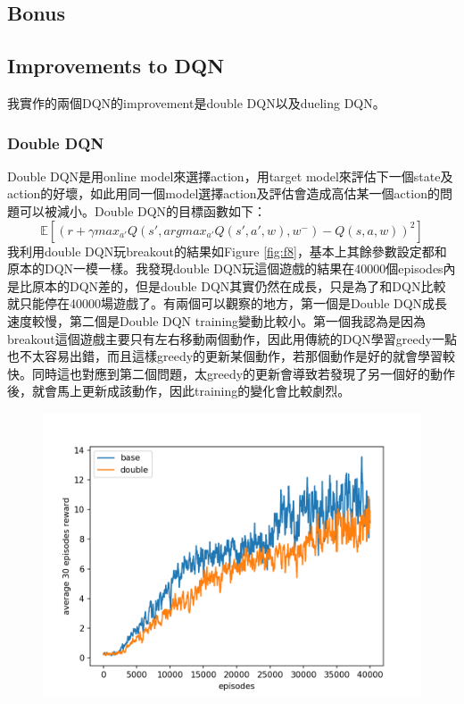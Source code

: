 \documentclass[12pt, a4paper]{article}
\begin{document}
\begin{CJK}{UTF8}{bkai}
\section{Bonus}

\subsection{Improvements to DQN}
我實作的兩個DQN的improvement是double DQN以及dueling DQN。
\subsubsection{Double DQN}
Double DQN是用online model來選擇action，用target model來評估下一個state及action的好壞，如此用同一個model選擇action及評估會造成高估某一個action的問題可以被減小。Double DQN的目標函數如下：
\[ \mathbb{E}[(r + \gamma max_{a'}Q(s', argmax_{a'}Q(s',a',w), w^{-}) - Q(s, a, w))^2] \]
我利用double DQN玩breakout的結果如Figure \ref{fig:f8}，基本上其餘參數設定都和原本的DQN一模一樣。我發現double DQN玩這個遊戲的結果在40000個episodes內是比原本的DQN差的，但是double DQN其實仍然在成長，只是為了和DQN比較就只能停在40000場遊戲了。有兩個可以觀察的地方，第一個是Double DQN成長速度較慢，第二個是Double DQN training變動比較小。第一個我認為是因為breakout這個遊戲主要只有左右移動兩個動作，因此用傳統的DQN學習greedy一點也不太容易出錯，而且這樣greedy的更新某個動作，若那個動作是好的就會學習較快。同時這也對應到第二個問題，太greedy的更新會導致若發現了另一個好的動作後，就會馬上更新成該動作，因此training的變化會比較劇烈。

\begin{figure}[!htb]
\centering
\includegraphics[scale=0.7]{dqn_db_avg_reward.png}


\end{figure}
\end{CJK}
\end{document}
